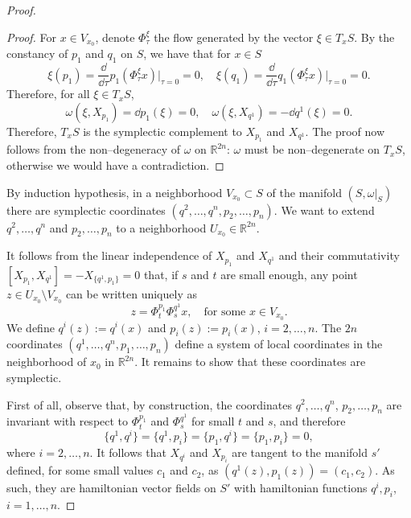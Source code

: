 \documentclass[english,fontsize=11pt,paper=b5]{scrbook}
\theoremstyle{definition}
\begin{document}
\begin{proof}
\begin{proof}
        For $x\in V_{x_0}$, denote $\Phi_\tau^\xi$ the flow generated by the vector $\xi\in T_x S$.
        By the constancy of $p_1$ and $q_1$ on $S$, we have that for $x\in S$
        \begin{equation}
          \xi(p_1) = \frac{\dd}{\dd\tau} p_1(\Phi_\tau^\xi x)\Big|_{\tau=0} = 0, \quad
          \xi(q_1) = \frac{\dd}{\dd\tau} q_1(\Phi_\tau^\xi x)\Big|_{\tau=0} = 0.
        \end{equation}
        Therefore, for all $\xi \in T_x S$,
        \begin{equation}
          \omega(\xi, X_{p_1}) = \dd p_1(\xi) = 0,\quad
          \omega(\xi, X_{q^1}) = -\dd q^1(\xi) = 0.
        \end{equation}
        Therefore, $T_x S$ is the symplectic complement to $X_{p_1}$ and $X_{q^1}$.
        The proof now follows from the non--degeneracy of $\omega$ on $\mathbb{R}^{2n}$: $\omega$ must be non--degenerate on $T_x S$, otherwise we would have a contradiction.
      \end{proof}

      By induction hypothesis, in a neighborhood $V_{x_0}\subset S$ of the manifold $(S, \omega|_S)$ there are symplectic coordinates $(q^2, \ldots, q^n, p_2, \ldots, p_n)$. We want to extend $q^2, \ldots, q^n$ and $p_2, \ldots, p_n$ to a neighborhood $U_{x_0}\in\mathbb{R}^{2n}$.

      It follows from the linear independence of $X_{p_1}$ and $X_{q^1}$ and their commutativity $[X_{p_1}, X_{q^1}] = -X_{\big\{q^1,p_1\big\}} = 0$ that, if $s$ and $t$ are small enough, any point $z\in U_{x_0}\setminus V_{x_0}$ can be written uniquely as
      \begin{equation}
        z = \Phi_t^{p_1}\Phi_s^{q^1} x, \quad\mbox{for some }x\in V_{x_0}.
      \end{equation}
      We define $q^i(z) := q^i(x)$ and $p_i(z) := p_i(x)$, $i=2,\ldots,n$.
      The $2n$ coordinates $(q^1, \ldots, q^n, p_1, \ldots, p_n)$ define a system of local coordinates in the neighborhood of $x_0$ in $\mathbb{R}^{2n}$. It remains to show that these coordinates are symplectic.

      First of all, observe that, by construction, the coordinates $q^2, \ldots, q^n$, $p_2, \ldots, p_n$ are invariant with respect to $\Phi_t^{p_1}$ and $\Phi_s^{q^1}$ for small $t$ and $s$, and therefore
      \begin{equation}
        \big\{q^1, q^i\big\} = \big\{q^1, p_i\big\} = \big\{p_1, q^i\big\} = \big\{p_1, p_i\big\} = 0,
      \end{equation}
      where $i = 2,\ldots,n$.
      It follows that $X_{q^i}$ and $X_{p_i}$ are tangent to the manifold $s'$ defined, for some small values $c_1$ and $c_2$, as $(q^1(z), p_1(z)) = (c_1, c_2)$.
      As such, they are hamiltonian vector fields on $S'$ with hamiltonian functions $q^i, p_i$, $i=1,\ldots,n$.


\end{proof}
\end{document}
